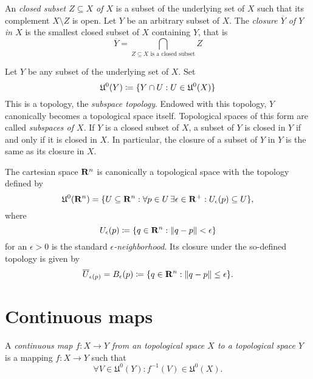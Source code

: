 An \emph{closed subset $Z \subseteq X$ of $X$} is a subset of the underlying
set of $X$ such that its complement $X \setminus Z$ is open. Let $Y$ be an
arbitrary subset of $X$. The \emph{closure $\overline Y$ of $Y$ in $X$} is the
smallest closed subset of $X$ containing $Y$, that is
\begin{equation}
  \overline Y = \bigcap_{\text{$Z \subseteq X$ is a closed subset}} Z
\end{equation}

Let $Y$ be any subset of the underlying set of $X$. Set
\[
  \mathfrak U^0(Y) \coloneqq \lbrace Y \cap U: U \in \mathfrak U^0(X)\rbrace
\]
This is a topology, the \emph{subspace topology}. Endowed with this topology,
$Y$ canonically becomes a topological space itself. Topological spaces of this form
are called \emph{subspaces of $X$}. If $Y$ is a closed subset of $X$, a subset of
$Y$ is closed in $Y$ if and only if it is closed in $X$. In particular, the closure
of a subset of $Y$ in $Y$ is the same as its closure in $X$.

The cartesian space $\mathbf{R}^n$ is canonically a topological space with the
topology defined by
\begin{equation}
  \label{eq:cartesian_topology}
  \mathfrak U^0(\mathbf{R}^n) = \lbrace U \subseteq \mathbf{R}^n : \forall p \in U \,
  \exists \epsilon \in \mathbf{R}^+: U_\epsilon(p) \subseteq U\rbrace,
\end{equation}
where
\begin{equation}
  U_\epsilon(p) \coloneqq \lbrace q \in \mathbf{R}^n : \lVert q - p\rVert < \epsilon\rbrace
\end{equation}
for an $\epsilon > 0$ is the standard \emph{$\epsilon$-neighborhood}. Its 
closure under the so-defined topology is given by
\begin{equation}
  \overline U_{\epsilon(p)} = B_\epsilon(p) \coloneqq
  \lbrace q \in \mathbf{R}^n : \lVert q - p\rVert \leq \epsilon\rbrace.
\end{equation}

\section{Continuous maps}
\label{sec:continuity}

\begin{dfn}
  A \emph{continuous map $f\colon X \to Y$ from an topological space $X$ to
  a topological space $Y$} is a mapping $f\colon X \to Y$ such that
  \[
    \forall V \in \mathfrak U^0(Y) : f^{-1}(V) \in \mathfrak U^0(X).
  \]
\end{dfn}

